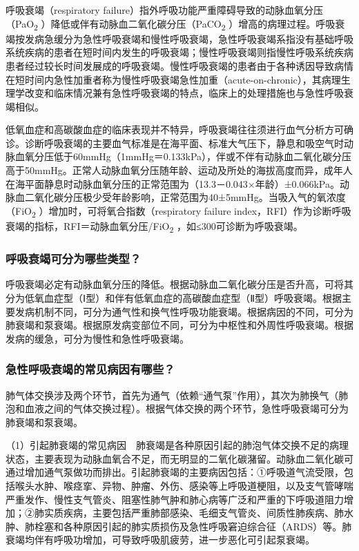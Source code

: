 呼吸衰竭（respiratory
failure）指外呼吸功能严重障碍导致的动脉血氧分压（PaO\textsubscript{2}
）降低或伴有动脉血二氧化碳分压（PaCO\textsubscript{2}
）增高的病理过程。呼吸衰竭按发病急缓分为急性呼吸衰竭和慢性呼吸衰竭，急性呼吸衰竭系指没有基础呼吸系统疾病的患者在短时间内发生的呼吸衰竭；慢性呼吸衰竭则指慢性呼吸系统疾病患者经过较长时间发展成的呼吸衰竭。慢性呼吸衰竭的患者由于各种诱因导致病情在短时间内急性加重者称为慢性呼吸衰竭急性加重（acute-on-chronic），其病理生理学改变和临床情况兼有急性呼吸衰竭的特点，临床上的处理措施也与急性呼吸衰竭相似。

低氧血症和高碳酸血症的临床表现并不特异，呼吸衰竭往往须进行血气分析方可确诊。诊断呼吸衰竭的主要血气标准是在海平面、标准大气压下，静息和吸空气时动脉血氧分压低于60mmHg（1mmHg＝0.133kPa），伴或不伴有动脉血二氧化碳分压高于50mmHg。正常人动脉血氧分压随年龄、运动及所处的海拔高度而异，成年人在海平面静息时动脉血氧分压的正常范围为（13.3－0.043×年龄）±0.066kPa。动脉血二氧化碳分压极少受年龄影响，正常范围为40±5mmHg。当吸入气的氧浓度（FiO\textsubscript{2}
）增加时，可将氧合指数（respiratory failure
index，RFI）作为诊断呼吸衰竭的指标，RFI＝动脉血氧分压/FiO\textsubscript{2}
，如≤300可诊断为呼吸衰竭。

\subsubsection{呼吸衰竭可分为哪些类型？}

呼吸衰竭必定有动脉血氧分压的降低。根据动脉血二氧化碳分压是否升高，可将其分为低氧血症型（Ⅰ型）和伴有低氧血症的高碳酸血症型（Ⅱ型）呼吸衰竭。根据主要发病机制不同，可分为通气性和换气性呼吸功能衰竭。根据病因的不同，可分为肺衰竭和泵衰竭。根据原发病变部位不同，可分为中枢性和外周性呼吸衰竭。根据发病的缓急，可分为慢性和急性呼吸衰竭。

\subsubsection{急性呼吸衰竭的常见病因有哪些？}

肺气体交换涉及两个环节，首先为通气（依赖“通气泵”作用），其次为肺换气（肺泡和血液之间的气体交换过程）。根据气体交换的两个环节，急性呼吸衰竭可分为肺衰竭和泵衰竭。

（1）引起肺衰竭的常见病因　肺衰竭是各种原因引起的肺泡气体交换不足的病理状态，主要表现为动脉血氧合不足，而无明显的二氧化碳潴留。动脉血二氧化碳可通过增加通气泵做功而排出。引起肺衰竭的主要病因包括：①呼吸道气流受限，包括喉头水肿、喉痉挛、异物、肿瘤、外伤、感染等上呼吸道梗阻，以及支气管哮喘严重发作、慢性支气管炎、阻塞性肺气肿和肺心病等广泛和严重的下呼吸道阻力增加；②肺实质疾病，主要包括严重肺部感染、毛细支气管炎、间质性肺疾病、肺水肿、肺栓塞和各种原因引起的肺实质损伤及急性呼吸窘迫综合征（ARDS）等。肺衰竭均伴有呼吸功增加，可导致呼吸肌疲劳，进一步恶化可引起泵衰竭。

